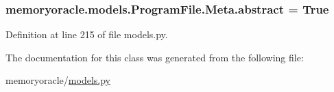 \subsubsection[{abstract}]{\setlength{\rightskip}{0pt plus 5cm}memoryoracle.\+models.\+Program\+File.\+Meta.\+abstract = True\hspace{0.3cm}{\ttfamily [static]}}\label{classmemoryoracle_1_1models_1_1ProgramFile_1_1Meta_a1f3d5255f5c71b2f180406bb92b2183f}


Definition at line 215 of file models.\+py.



The documentation for this class was generated from the following file\+:\begin{DoxyCompactItemize}
\item 
memoryoracle/\hyperlink{models_8py}{models.\+py}\end{DoxyCompactItemize}
